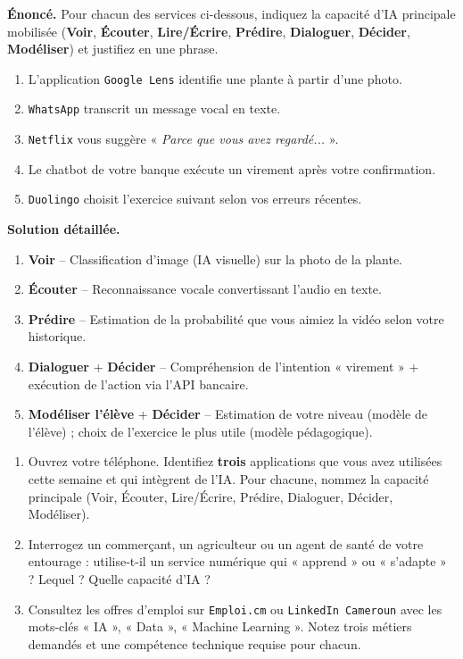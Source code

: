\documentclass[11pt]{article}
\begin{document}
\begin{exoresolu}
\textbf{Énoncé.} Pour chacun des services ci-dessous, indiquez la capacité d'IA principale mobilisée (\textbf{Voir}, \textbf{Écouter}, \textbf{Lire/Écrire}, \textbf{Prédire}, \textbf{Dialoguer}, \textbf{Décider}, \textbf{Modéliser}) et justifiez en une phrase.

\begin{enumerate}
    \item L'application \texttt{Google Lens} identifie une plante à partir d'une photo.
    \item \texttt{WhatsApp} transcrit un message vocal en texte.
    \item \texttt{Netflix} vous suggère « \emph{Parce que vous avez regardé...} ».
    \item Le chatbot de votre banque exécute un virement après votre confirmation.
    \item \texttt{Duolingo} choisit l'exercice suivant selon vos erreurs récentes.
\end{enumerate}

\textbf{Solution détaillée.}
\begin{enumerate}
    \item \textbf{Voir} -- Classification d'image (IA visuelle) sur la photo de la plante.
    \item \textbf{Écouter} -- Reconnaissance vocale convertissant l'audio en texte.
    \item \textbf{Prédire} -- Estimation de la probabilité que vous aimiez la vidéo selon votre historique.
    \item \textbf{Dialoguer} + \textbf{Décider} -- Compréhension de l'intention « virement » + exécution de l'action via l'API bancaire.
    \item \textbf{Modéliser l'élève} + \textbf{Décider} -- Estimation de votre niveau (modèle de l'élève) ; choix de l'exercice le plus utile (modèle pédagogique).
\end{enumerate}
\end{exoresolu}

\begin{exercice}
\begin{enumerate}
    \item Ouvrez votre téléphone. Identifiez \textbf{trois} applications que vous avez utilisées cette semaine et qui intègrent de l'IA. Pour chacune, nommez la capacité principale (Voir, Écouter, Lire/Écrire, Prédire, Dialoguer, Décider, Modéliser).
    \item Interrogez un commerçant, un agriculteur ou un agent de santé de votre entourage : utilise-t-il un service numérique qui « apprend » ou « s'adapte » ? Lequel ? Quelle capacité d'IA ?
    \item Consultez les offres d'emploi sur \texttt{Emploi.cm} ou \texttt{LinkedIn Cameroun} avec les mots-clés « IA », « Data », « Machine Learning ». Notez trois métiers demandés et une compétence technique requise pour chacun.
\end{enumerate}
\end{exercice}
\end{document}
